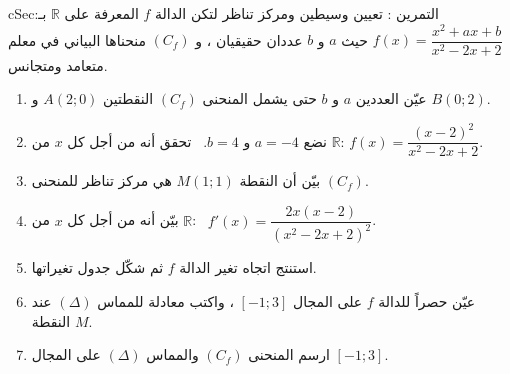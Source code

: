 \documentclass[12pt,a4paper]{article}
\newenvironment{BOX}[2]{\begin{otherlanguage}{english}\begin{arbox}{#1}{#2}}{\end{arbox}\end{otherlanguage}}
\newcounter{exo}
\newenvironment{tamrin}[1]{\stepcounter{exo}\begin{BOX}{cSec}{التمرين \theexo: #1}}{\end{BOX}}
\newcommand{\R}{\mathbb{R}}
\begin{document}
\begin{tamrin}{تعيين وسيطين ومركز تناظر}
لتكن الدالة $f$ المعرفة على $\R$ بـ: $f(x)=\dfrac{x^2+ax+b}{x^2-2x+2}$ حيث $a$ و $b$ عددان حقيقيان ، و $(C_f)$ منحناها البياني في معلم متعامد ومتجانس.
\begin{enumerate}
\item عيّن العددين $a$ و $b$ حتى يشمل المنحنى $(C_f)$ النقطتين $A(2;0)$ و $B(0;2)$.
\item نضع $a=-4$ و $b=4$. \ تحقق أنه من أجل كل $x$ من $\R$: $f(x)=\dfrac{(x-2)^2}{x^2-2x+2}$.
\item بيّن أن النقطة $M(1;1)$ هي مركز تناظر للمنحنى $(C_f)$.
\item بيّن أنه من أجل كل $x$ من $\R$: \ $f'(x)=\dfrac{2x(x-2)}{(x^2-2x+2)^2}$.
\item استنتج اتجاه تغير الدالة $f$ ثم شكّل جدول تغيراتها.
\item عيّن حصراً للدالة $f$ على المجال $[-1;3]$ ، واكتب معادلة للمماس $(\Delta)$ عند النقطة $M$.
\item ارسم المنحنى $(C_f)$ والمماس $(\Delta)$ على المجال $[-1;3]$.
\end{enumerate}
\end{tamrin}
\end{document}
